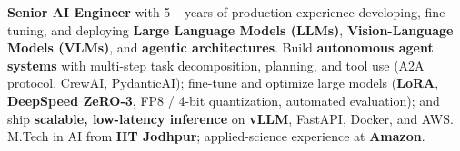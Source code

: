 \documentclass[letter,10pt]{article}
\begin{document}

\textbf{Senior AI Engineer} with 5+ years of production experience developing, fine-tuning, and deploying \textbf{Large Language Models (LLMs)}, \textbf{Vision-Language Models (VLMs)}, and \textbf{agentic architectures}.
Build \textbf{autonomous agent systems} with multi-step task decomposition, planning, and tool use (A2A protocol, CrewAI, PydanticAI); fine-tune and optimize large models (\textbf{LoRA}, \textbf{DeepSpeed ZeRO-3}, FP8 / 4-bit quantization, automated evaluation); and ship \textbf{scalable, low-latency inference} on \textbf{vLLM}, FastAPI, Docker, and AWS.
M.Tech in AI from \textbf{IIT Jodhpur}; applied-science experience at \textbf{Amazon}.
\end{document}
